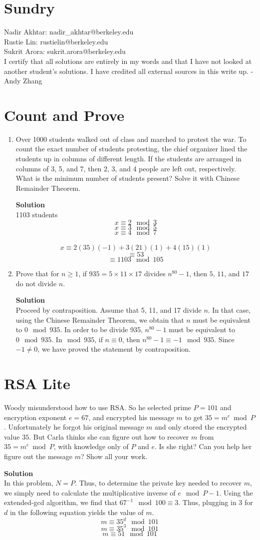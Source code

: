 \documentclass[11pt]{article}
\newcommand*{\Question}[1]{\section{#1}}
\newenvironment{Parts}{\begin{enumerate}[label=(\alph*)]}{\end{enumerate}}
\newcommand*{\Part}{\item}
\newenvironment{Answer}{\vspace{10pt}\begin{mdframed}\textbf{Solution}\\}{\end{mdframed}\vfill\pagebreak[3]}
\newenvironment{Answer}{\vspace{10pt}}{\vfill\pagebreak[3]}
\begin{document}
\Question{Sundry} 
\vspace{10pt}
\noindent Nadir Akhtar: nadir\_akhtar@berkeley.edu\\
Rustie Lin: rustielin@berkeley.edu\\
Sukrit Arora: sukrit.arora@berkeley.edu\\

I certify that all solutions are entirely in my words and that I have not looked at another student’s
solutions. I have credited all external sources in this write up. - Andy Zhang
\vfill\pagebreak[3]

\Question{Count and Prove}
\begin{Parts}
\Part
Over 1000 students walked out of class and marched to protest the war. To count the exact number of students protesting, the chief organizer lined the students up in columns of different length. If the students are arranged in columns of 3, 5, and 7, then 2, 3, and 4 people are left out, respectively.  What is the minimum number of students present?  Solve it with Chinese Remainder Theorem. 
\begin{Answer}
1103 students
\\
$$x \equiv 2 \mod 3$$
$$x \equiv 3 \mod 5$$
$$x \equiv 4 \mod 7$$
\\
$$x \equiv 2(35)(-1)+3(21)(1)+4(15)(1)$$
$$\equiv 53$$
$$\equiv 1103 \mod 105$$
\end{Answer}

\Part
Prove that for $n\geq 1$, if $935 = 5 \times 11 \times 17$ divides $n^{80} -1$, then $5$, $11$, and $17$ do not divide $n$.
\begin{Answer}
Proceed by contraposition. Assume that 5, 11, and 17 divide $n$. In that case, using the Chinese Remainder Theorem, we obtain that $n$ must be equivalent to $0 \mod 935$. In order to be divide 935, $n^{80}-1$ must be equivalent to $0 \mod 935$. In$\mod 935$, if $n \equiv 0$, then $n^{80}-1 \equiv -1 \mod 935$. Since $-1 \not = 0$, we have proved the statement by contraposition. 
\end{Answer}
\end{Parts}


\Question{RSA Lite} 

Woody misunderstood how to use RSA. 
So he selected prime $P = 101$ and encryption 
exponent $e = 67$, and encrypted his message $m$ to get $35 = m^e \bmod P$.
Unfortunately he forgot his original message $m$
and only stored the encrypted value $35$. But Carla thinks she 
can figure out how to recover $m$ from $35 = m^e \bmod P$, with 
knowledge only of $P$ and $e$. Is she right? 
Can you help her figure out the message $m$? Show all your work. 
\begin{Answer}
In this problem, $N=P$. Thus, to determine the private key needed to recover $m$, we simply need to calculate the multiplicative inverse of $e \mod P-1$. Using the extended-gcd algorithm, we find that $67^{-1} \mod 100 \equiv 3$. Thus, plugging in 3 for $d$ in the following equation yields the value of $m$. $$m \equiv 35^d \mod 101$$ $$m \equiv 35^3 \mod 101$$ $$m \equiv 51 \mod 101$$
\end{Answer}
\end{document}
